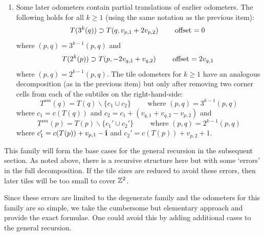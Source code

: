 \documentclass[12pt]{amsart}
\begin{document}
\begin{prop}
\begin{enumerate}[label=(\alph*)]
	 \item Some later odometers contain partial translations of earlier odometers. The following holds for all $k \geq 1$ (using the same 
	 notation as the previous item):
	\begin{equation} \label{eq:even_staircase_decomp}
	 T(3^{k}(q)) \supset T(q, v_{p,1}+2v_{p,2}) \qquad \mbox{ offset $=0$ } \\
	\end{equation}
	where $(p,q) = 3^{k-1}(p,q)$ and 
	\begin{equation} \label{eq:odd_staircase_decomp}
	T(2^{k}(p)) \supset T(p,-2v_{q,1}+v_{q,2}) \qquad \mbox{ offset $=2v_{q,1}$ } \\
	\end{equation}
	where $(p,q) = 2^{k-1}(p,q)$. The tile odometers for $k \geq 1$ have an analogous decomposition (as in the previous item) but only after removing two corner cells from each of the subtiles on the right-hand-side: 
	\begin{equation} \label{eq:truncated_even_staircase}
	T^{sm}(q) = T(q) \backslash \{ c_1 \cup c_2 \} \qquad \mbox{ where $(p,q) = 3^{k-1}(p,q)$}
	\end{equation}
	where $c_1 =  c(T(q))$ and $c_2 = c_1 +  (v_{q,1} +v_{q,2}-v_{p,2})$ and
	\begin{equation} \label{eq:truncated_odd_staircase}
	T^{sm}(p) = T(p) \backslash \{ c_1' \cup c_2' \} \qquad \mbox{ where $(p,q) = 2^{k-1}(p,q)$}
	\end{equation}
	where $c_1' =  c(T(p)) + v_{p,1}-\mathbf{i}$ and $c_2' =  c(T(p))+v_{p,2}+1$.

		
\end{enumerate}






	
	
\end{prop}




This family will form the base cases for the general recursion in the subsequent section. 
As noted above, there is a recursive structure here but with some `errors' 
in the full decomposition. If the tile sizes are reduced to avoid these errors, then later tiles
will be too small to cover $\mathbb{Z}^2$. 

Since these errors are limited to the degenerate family and the odometers for this family 
are so simple, we take the cumbersome but elementary approach and provide the exact formulae. 
One could avoid this by adding additional cases to the general recursion. 
\end{document}
